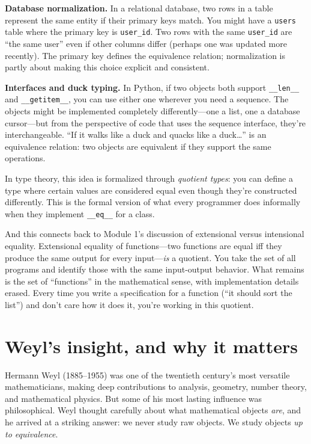 \documentclass[11pt]{article}
\begin{document}
\textbf{Database normalization.} In a relational database, two rows in a table represent the same entity if their primary keys match. You might have a \texttt{users} table where the primary key is \texttt{user\_id}. Two rows with the same \texttt{user\_id} are ``the same user'' even if other columns differ (perhaps one was updated more recently). The primary key defines the equivalence relation; normalization is partly about making this choice explicit and consistent.

\textbf{Interfaces and duck typing.} In Python, if two objects both support \texttt{\_\_len\_\_} and \texttt{\_\_getitem\_\_}, you can use either one wherever you need a sequence. The objects might be implemented completely differently---one a list, one a database cursor---but from the perspective of code that uses the sequence interface, they're interchangeable. ``If it walks like a duck and quacks like a duck\ldots'' is an equivalence relation: two objects are equivalent if they support the same operations.

In type theory, this idea is formalized through \emph{quotient types}: you can define a type where certain values are considered equal even though they're constructed differently. This is the formal version of what every programmer does informally when they implement \texttt{\_\_eq\_\_} for a class.

And this connects back to Module 1's discussion of extensional versus intensional equality. Extensional equality of functions---two functions are equal iff they produce the same output for every input---\emph{is} a quotient. You take the set of all programs and identify those with the same input-output behavior. What remains is the set of ``functions'' in the mathematical sense, with implementation details erased. Every time you write a specification for a function (``it should sort the list'') and don't care how it does it, you're working in this quotient.

\section{Weyl's insight, and why it matters}

Hermann Weyl (1885--1955) was one of the twentieth century's most versatile mathematicians, making deep contributions to analysis, geometry, number theory, and mathematical physics. But some of his most lasting influence was philosophical. Weyl thought carefully about what mathematical objects \emph{are}, and he arrived at a striking answer: we never study raw objects. We study objects \emph{up to equivalence}.
\end{document}
